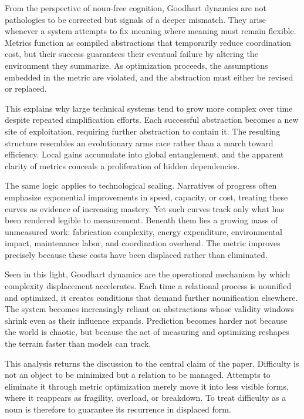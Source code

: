 \documentclass[12pt]{article}
\begin{document}
From the perspective of noun-free cognition, Goodhart dynamics are not pathologies to be corrected but signals of a deeper mismatch. They arise whenever a system attempts to fix meaning where meaning must remain flexible. Metrics function as compiled abstractions that temporarily reduce coordination cost, but their success guarantees their eventual failure by altering the environment they summarize. As optimization proceeds, the assumptions embedded in the metric are violated, and the abstraction must either be revised or replaced.

This explains why large technical systems tend to grow more complex over time despite repeated simplification efforts. Each successful abstraction becomes a new site of exploitation, requiring further abstraction to contain it. The resulting structure resembles an evolutionary arms race rather than a march toward efficiency. Local gains accumulate into global entanglement, and the apparent clarity of metrics conceals a proliferation of hidden dependencies.

The same logic applies to technological scaling. Narratives of progress often emphasize exponential improvements in speed, capacity, or cost, treating these curves as evidence of increasing mastery. Yet such curves track only what has been rendered legible to measurement. Beneath them lies a growing mass of unmeasured work: fabrication complexity, energy expenditure, environmental impact, maintenance labor, and coordination overhead. The metric improves precisely because these costs have been displaced rather than eliminated.

Seen in this light, Goodhart dynamics are the operational mechanism by which complexity displacement accelerates. Each time a relational process is nounified and optimized, it creates conditions that demand further nounification elsewhere. The system becomes increasingly reliant on abstractions whose validity windows shrink even as their influence expands. Prediction becomes harder not because the world is chaotic, but because the act of measuring and optimizing reshapes the terrain faster than models can track.

This analysis returns the discussion to the central claim of the paper. Difficulty is not an object to be minimized but a relation to be managed. Attempts to eliminate it through metric optimization merely move it into less visible forms, where it reappears as fragility, overload, or breakdown. To treat difficulty as a noun is therefore to guarantee its recurrence in displaced form.
\end{document}

